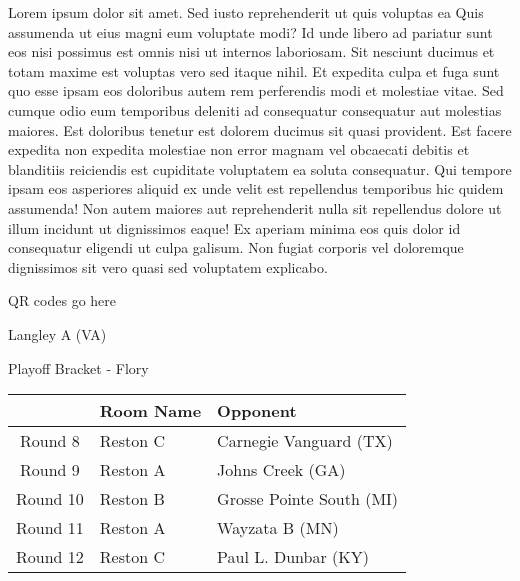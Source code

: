 \documentclass{article}%
\begin{document}
\vspace*{8pt}%
\linebreak%
\newline%
\newline%
Lorem ipsum dolor sit amet. Sed iusto reprehenderit ut quis voluptas ea Quis assumenda ut eius magni eum voluptate modi? Id unde libero ad pariatur sunt eos nisi possimus est omnis nisi ut internos laboriosam. Sit nesciunt ducimus et totam maxime est voluptas vero sed itaque nihil. Et expedita culpa et fuga sunt quo esse ipsam eos doloribus autem rem perferendis modi et molestiae vitae.\newline%
\newline%
Sed cumque odio eum temporibus deleniti ad consequatur consequatur aut molestias maiores. Est doloribus tenetur est dolorem ducimus sit quasi provident. Est facere expedita non expedita molestiae non error magnam vel obcaecati debitis et blanditiis reiciendis est cupiditate voluptatem ea soluta consequatur. Qui tempore ipsam eos asperiores aliquid ex unde velit est repellendus temporibus hic quidem assumenda!\newline%
\newline%
Non autem maiores aut reprehenderit nulla sit repellendus dolore ut illum incidunt ut dignissimos eaque! Ex aperiam minima eos quis dolor id consequatur eligendi ut culpa galisum. Non fugiat corporis vel doloremque dignissimos sit vero quasi sed voluptatem explicabo.\newline%
\newline%
%
\vspace*{30pt}%
\begin{center}%
\begin{Huge}%
QR codes go here%
\end{Huge}%
\end{center}%
\newpage%
\begin{center}%
\begin{Huge}%
Langley A (VA)%
\end{Huge}%
\vspace*{8pt}%
\linebreak%
\begin{Large}%
Playoff Bracket {-} Flory%
\end{Large}%
\end{center}%
%
\begin{tabularx}{\textwidth}{|c|Y|Y|}%
\hline%
&Room Name&Opponent\\%
\hline%
Round 8&Reston C&Carnegie Vanguard (TX)\\%
Round 9&Reston A&Johns Creek (GA)\\%
Round 10&Reston B&Grosse Pointe South (MI)\\%
Round 11&Reston A&Wayzata B (MN)\\%
Round 12&Reston C&Paul L. Dunbar (KY)\\%
\hline%
\end{tabularx}%
\end{document}
